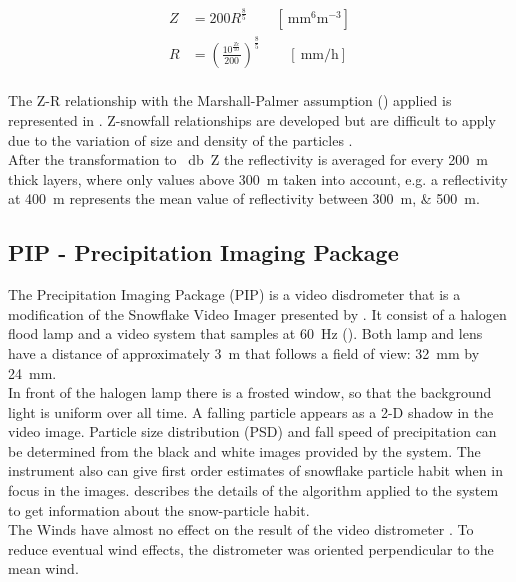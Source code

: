 \begin{align}
	Z & = 200 R^{\frac{8}{5}} \qquad [\SI{}{\mm^6\metre^{-3}} ] \nonumber \\ 
	R & = \left( \frac{ 10^{\frac{Ze}{10}} }{200} \right)^{\frac{8}{5}} \qquad [ \SI{}{\mm\per\hour} ]
	\label{eq:Z-R}
\end{align}
\\
The Z-R relationship with the Marshall-Palmer assumption () applied is represented in . Z-snowfall relationships are developed but are difficult to apply due to the variation of size and density of the particles \citep{lecuyer_aos_2017}. \\
After the transformation to \SI{}{\decibel Z} the reflectivity is averaged for every \SI{200}{\metre} thick layers, where only values above \SI{300}{\metre} taken into account, e.g. a reflectivity at \SI{400}{\metre} represents the mean value of reflectivity between \SIlist{300;500}{\metre}. 


\newpage
\subsection{PIP - Precipitation Imaging Package}

The Precipitation Imaging Package (PIP) is a video disdrometer that is a modification of the Snowflake Video Imager presented by \citet{newman_presenting_2009}. It consist of a halogen flood lamp and a video system that samples at \SI{60}{\Hz} (). 
Both lamp and lens have a distance of approximately \SI{3}{\metre} that follows a field of view: \SI{32}{\mm} by \SI{24}{\mm}. 
\\
In front of the halogen lamp there is a frosted window, so that the background light is uniform over all time. A falling particle appears as a 2-D shadow in the video image. 
Particle size distribution (PSD) and fall speed of precipitation can be determined from the black and white images provided by the system. The instrument also can give first order estimates of snowflake particle habit when in focus in the images.  
\citet{newman_presenting_2009} describes the details of the algorithm applied to the system to get information about the snow-particle habit. \\
The Winds have almost no effect on the result of the video distrometer \citep{newman_presenting_2009}. To reduce eventual wind effects, the distrometer was oriented perpendicular to the mean wind.
\newpage
